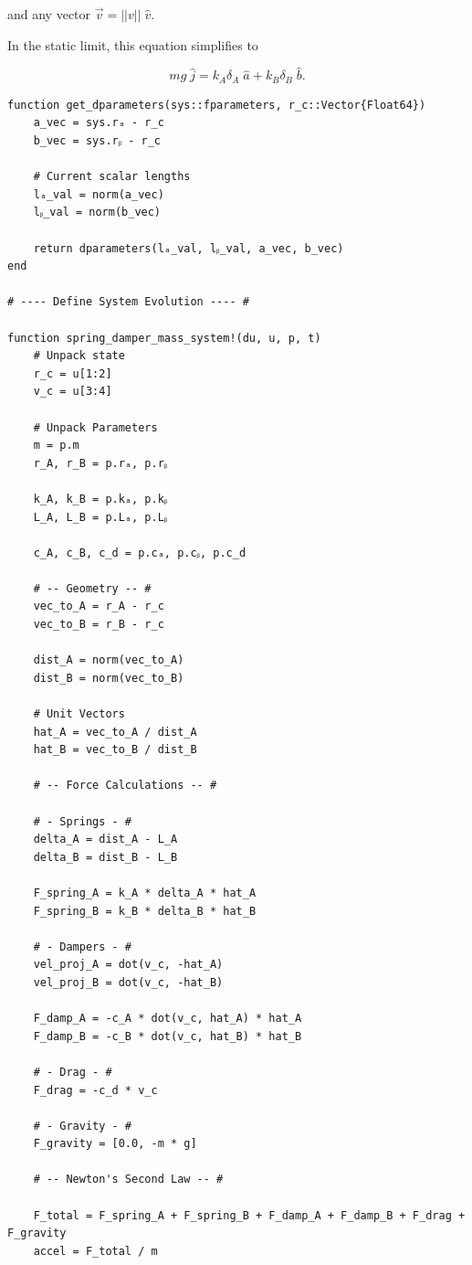 and any vector $\vec{v} = ||v|| \; \hat{v}$.

In the static limit, this equation simplifies to

\begin{equation}
    mg \; \hat{j} = k_A\delta_A \; \hat{a} + k_B\delta_B \; \hat{b}.
\end{equation}

\begin{verbatim}
function get_dparameters(sys::fparameters, r_c::Vector{Float64})
    a_vec = sys.rₐ - r_c
    b_vec = sys.rᵦ - r_c

    # Current scalar lengths
    lₐ_val = norm(a_vec)
    lᵦ_val = norm(b_vec)

    return dparameters(lₐ_val, lᵦ_val, a_vec, b_vec)
end

# ---- Define System Evolution ---- #

function spring_damper_mass_system!(du, u, p, t)
    # Unpack state
    r_c = u[1:2]
    v_c = u[3:4]

    # Unpack Parameters
    m = p.m
    r_A, r_B = p.rₐ, p.rᵦ

    k_A, k_B = p.kₐ, p.kᵦ
    L_A, L_B = p.Lₐ, p.Lᵦ

    c_A, c_B, c_d = p.cₐ, p.cᵦ, p.c_d

    # -- Geometry -- #
    vec_to_A = r_A - r_c
    vec_to_B = r_B - r_c

    dist_A = norm(vec_to_A)
    dist_B = norm(vec_to_B)

    # Unit Vectors
    hat_A = vec_to_A / dist_A
    hat_B = vec_to_B / dist_B

    # -- Force Calculations -- #

    # - Springs - #
    delta_A = dist_A - L_A
    delta_B = dist_B - L_B

    F_spring_A = k_A * delta_A * hat_A
    F_spring_B = k_B * delta_B * hat_B

    # - Dampers - #
    vel_proj_A = dot(v_c, -hat_A)
    vel_proj_B = dot(v_c, -hat_B)

    F_damp_A = -c_A * dot(v_c, hat_A) * hat_A
    F_damp_B = -c_B * dot(v_c, hat_B) * hat_B

    # - Drag - #
    F_drag = -c_d * v_c

    # - Gravity - #
    F_gravity = [0.0, -m * g]

    # -- Newton's Second Law -- #

    F_total = F_spring_A + F_spring_B + F_damp_A + F_damp_B + F_drag + F_gravity
    accel = F_total / m


\end{verbatim}
